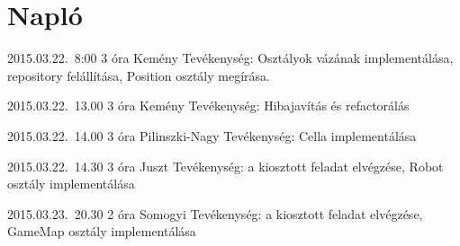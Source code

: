 %
\section{Napló}

\begin{naplo}

\bejegyzes
{2015.03.22.~8:00}
{3 óra}
{Kemény}
{Tevékenység: Osztályok vázának implementálása, repository felállítása, Position osztály megírása.}

\bejegyzes
{2015.03.22.~13.00}
{3 óra}
{Kemény}
{Tevékenység: Hibajavítás és refactorálás}

\bejegyzes
{2015.03.22.~14.00}
{3 óra}
{Pilinszki-Nagy}
{Tevékenység: Cella implementálása}

\bejegyzes
{2015.03.22.~14.30}
{3 óra}
{Juszt}
{Tevékenység: a kiosztott feladat elvégzése, Robot osztály implementálása}

\bejegyzes
{2015.03.23.~20.30}
{2 óra}
{Somogyi}
{Tevékenység: a kiosztott feladat elvégzése, GameMap osztály implementálása}


\end{naplo}

